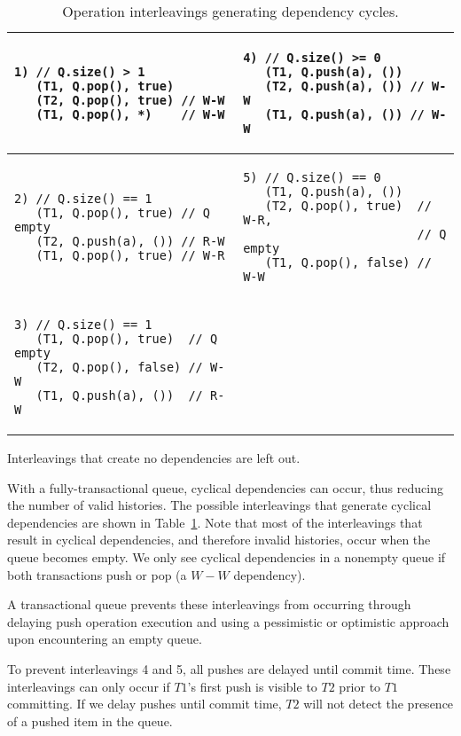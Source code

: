 \begin{table}
    \centering
    \begin{tabular}{|l|l|}
        \hline
\begin{lstlisting}
1) // Q.size() > 1 
   (T1, Q.pop(), true)  
   (T2, Q.pop(), true) // W-W
   (T1, Q.pop(), *)    // W-W
\end{lstlisting}
        &
\begin{lstlisting}
4) // Q.size() >= 0 
   (T1, Q.push(a), ()) 
   (T2, Q.push(a), ()) // W-W
   (T1, Q.push(a), ()) // W-W
\end{lstlisting}
\\
\hline
\begin{lstlisting}
2) // Q.size() == 1  
   (T1, Q.pop(), true) // Q empty  
   (T2, Q.push(a), ()) // R-W
   (T1, Q.pop(), true) // W-R
    \end{lstlisting}
        &
\begin{lstlisting}
5) // Q.size() == 0 
   (T1, Q.push(a), ())       
   (T2, Q.pop(), true)  // W-R,
                        // Q empty
   (T1, Q.pop(), false) // W-W
\end{lstlisting}
\\
    \hline
    \begin{lstlisting}
3) // Q.size() == 1  
   (T1, Q.pop(), true)  // Q empty  
   (T2, Q.pop(), false) // W-W     
   (T1, Q.push(a), ())  // R-W     
   \end{lstlisting} &\\
        \hline
\end{tabular}
    \caption*{Interleavings that create no dependencies are left out.}
    \caption{Operation interleavings generating dependency cycles.}
    \label{tab:interleavings}
\end{table}

With a fully-transactional queue, cyclical dependencies can occur, thus reducing the number of valid histories. The possible interleavings that generate cyclical dependencies are shown in Table~\ref{tab:interleavings}. Note that most of the interleavings that result in cyclical dependencies, and therefore invalid histories, occur when the queue becomes empty. 
We only see cyclical dependencies in a nonempty queue if both transactions push or pop (a $W-W$ dependency).

A transactional queue prevents these interleavings from occurring through delaying push operation execution and using a pessimistic or optimistic approach upon encountering an empty queue.

To prevent interleavings 4 and 5, all pushes are delayed until commit time. These interleavings can only occur if $T1$'s first push is visible to $T2$ prior to $T1$ committing. If we delay pushes until commit time, $T2$ will not detect the presence of a pushed item in the queue.

